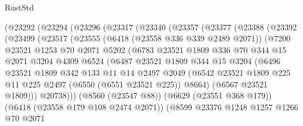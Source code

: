 \begin{lexlean}{RustStd}
\begin{coremodule}
      (@23292
        (@23294
          (@23296
            (@23317
              (@23340
                (@23357
                  (@23377
                    (@23388
                      (@23392
                        (@23499
                          (@23517
                            (@23555
                              (@6418 (@23558 @336 @339 @2489 @2071))
                              (@7200
                                @23521
                                @1253
                                @70
                                @2071
                                @5202
                                (@6783
                                  @23521
                                  @1809
                                  @336
                                  @70
                                  @344
                                  @15
                                  @2071
                                  @3204
                                  @4309
                                  @6524
                                  (@6487
                                    @23521
                                    @1809
                                    @344
                                    @15
                                    @3204
                                    (@6496
                                      @23521
                                      @1809
                                      @342
                                      @133
                                      @11
                                      @14
                                      @2497
                                      @2049
                                      (@6542
                                        @23521
                                        @1809
                                        @225
                                        @11
                                        @225
                                        @2497
                                        (@6550 (@6551 @23521 @225))
                                        @8664)
                                      (@6567 @23521 @1809)))
                                  @20738)))
                            (@8560 (@23547 @88))
                            (@6629 (@23551 @368 @179))
                            (@6418 (@23558 @179 @108 @2474 @2071))
                            (@8599
                              @23376
                              @1248
                              @1257
                              @1266
                              @70
                              @2071

\end{coremodule}
\end{lexlean}
